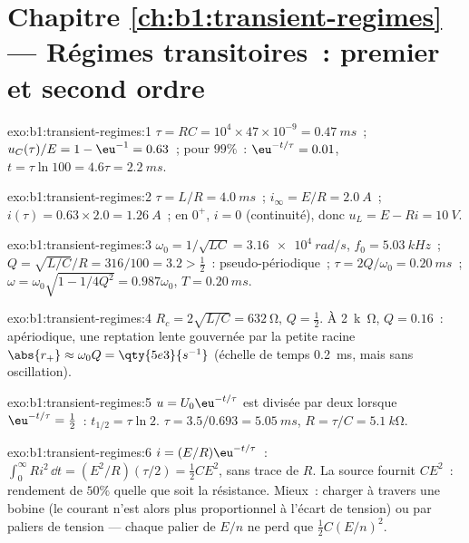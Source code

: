 \section*{Chapitre \ref{ch:b1:transient-regimes} --- Régimes transitoires~: premier et second ordre}

\begin{solution}{exo:b1:transient-regimes:1}
$\tau = RC = 10^4 \times 47\times10^{-9} = \qty{0.47}{ms}$~; $u_C(\tau)/E
= 1 - \eu^{-1} = 0.63$~; pour $99\%$~: $\eu^{-t/\tau} = 0.01$, $t = \tau\ln 100
= 4.6\tau = \qty{2.2}{ms}$.
\end{solution}

\begin{solution}{exo:b1:transient-regimes:2}
$\tau = L/R = \qty{4.0}{ms}$~; $i_\infty = E/R = \qty{2.0}{A}$~; $i(\tau) =
0.63 \times 2.0 = \qty{1.26}{A}$~; en $0^+$, $i = 0$ (continuité), donc
$u_L = E - Ri = \qty{10}{V}$.
\end{solution}

\begin{solution}{exo:b1:transient-regimes:3}
$\omega_0 = 1/\sqrt{LC} = \qty{3.16e4}{rad/s}$, $f_0 = \qty{5.03}{kHz}$~;
$Q = \sqrt{L/C}/R = 316/100 = 3.2 > \tfrac12$~: pseudo-périodique~;
$\tau = 2Q/\omega_0 = \qty{0.20}{ms}$~; $\omega = \omega_0\sqrt{1 - 1/4Q^2}
= 0.987\omega_0$, $T = \qty{0.20}{ms}$.
\end{solution}

\begin{solution}{exo:b1:transient-regimes:4}
$R_c = 2\sqrt{L/C} = \qty{632}{\ohm}$, $Q = \tfrac12$. À \qty{2}{k\ohm},
$Q = 0.16$~: apériodique, une reptation lente gouvernée par la petite
racine $\abs{r_+} \approx \omega_0 Q = \qty{5e3}{s^{-1}}$ (échelle de
temps \qty{0.2}{ms}, mais sans oscillation).
\end{solution}

\begin{solution}{exo:b1:transient-regimes:5}
$u = U_0\eu^{-t/\tau}$ est divisée par deux lorsque $\eu^{-t/\tau} = \tfrac12$~: $t_{1/2}
= \tau\ln 2$. $\tau = 3.5/0.693 = \qty{5.05}{ms}$, $R = \tau/C =
\qty{5.1}{k\ohm}$.
\end{solution}

\begin{solution}{exo:b1:transient-regimes:6}
$i = (E/R)\eu^{-t/\tau}$~: $\int_0^\infty Ri^2\,\dd t = (E^2/R)(\tau/2) =
\tfrac12 CE^2$, sans trace de $R$. La source fournit $CE^2$~: rendement
de $50\%$ quelle que soit la résistance. Mieux~: charger à travers une
bobine (le courant n'est alors plus proportionnel à l'écart de tension)
ou par paliers de tension --- chaque palier de $E/n$ ne perd que
$\tfrac12 C(E/n)^2$.
\end{solution}


